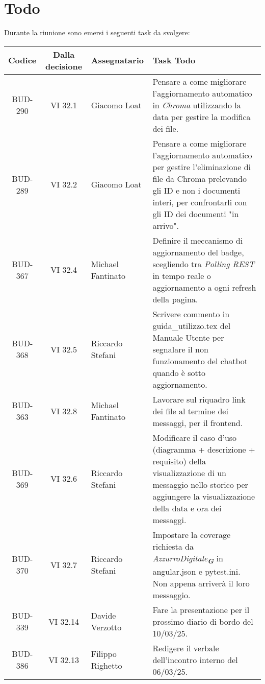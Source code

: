 
\section{Todo}

Durante la riunione sono emersi i seguenti task da svolgere:

\vspace{0.5cm}

\begin{table}[htbp]
\centering
{}
\begin{tabular}{|c|c|p{}|p{}|}
    \hline
    \rowcolor[gray]{0.75}
    \textbf{Codice} & \textbf{Dalla decisione} & \textbf{Assegnatario} & \textbf{Task Todo} \\
    \hline
    BUD-290 & VI 32.1 & Giacomo Loat & Pensare a come migliorare l'aggiornamento automatico in \emph{Chroma} utilizzando la data per gestire la modifica dei file.\\
    \hline
    BUD-289 & VI 32.2 & Giacomo Loat & Pensare a come migliorare l’aggiornamento automatico per gestire l’eliminazione di file da Chroma prelevando gli ID e non i documenti interi, per confrontarli con gli ID dei documenti "in arrivo".\\
    \hline
    BUD-367 & VI 32.4 & Michael Fantinato & Definire il meccanismo di aggiornamento del badge, scegliendo tra \emph{Polling REST} in tempo reale o aggiornamento a ogni refresh della pagina. \\
    \hline 
    BUD-368 & VI 32.5 & Riccardo Stefani & Scrivere commento in guida\_utilizzo.tex del Manuale Utente per segnalare il non funzionamento del chatbot quando è sotto aggiornamento. \\
    \hline
    BUD-363 & VI 32.8 & Michael Fantinato & Lavorare sul riquadro link dei file al termine dei messaggi, per il frontend. \\
    \hline
    BUD-369 & VI 32.6 & Riccardo Stefani & Modificare il caso d’uso (diagramma + descrizione + requisito) della visualizzazione di un messaggio nello storico per aggiungere la visualizzazione della data e ora dei messaggi. \\
    \hline
    BUD-370 & VI 32.7 & Riccardo Stefani & Impostare la coverage richiesta da \emph{AzzurroDigitale}\textsubscript{\textit{\textbf{G}}} in angular.json e pytest.ini. Non appena arriverà il loro messaggio. \\
    \hline
    BUD-339 & VI 32.14 & Davide Verzotto & Fare la presentazione per il prossimo diario di bordo del 10/03/25. \\
    \hline
    BUD-386 & VI 32.13 & Filippo Righetto & Redigere il verbale dell'incontro interno del 06/03/25. \\
    \hline
\end{tabular}
\end{table}
